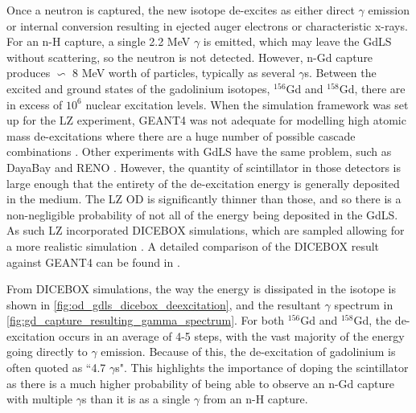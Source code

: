 

\par
Once a neutron is captured, the new isotope de-excites as either direct $\gamma$ emission or internal conversion resulting in ejected auger electrons or characteristic x-rays.
For an n-H capture, a single 2.2 MeV $\gamma$ is emitted, which may leave the GdLS without scattering, so the neutron is not detected.
However, n-Gd capture produces $\backsim$ 8 MeV worth of particles, typically as several $\gamma$s.
Between the excited and ground states of the gadolinium isotopes, ${}^{156}$Gd and ${}^{158}$Gd, there are in excess of $10^{6}$ nuclear excitation levels.
When the simulation framework was set up for the LZ experiment, GEANT4 was not adequate for modelling high atomic mass de-excitations where there are a huge number of possible cascade combinations \cite{ucsb_gdls_dicebox_simulations_ref}.
Other experiments with GdLS have the same problem, such as DayaBay \cite{dayabay_overview_ref} and RENO \cite{reno_overview_ref}.
However, the quantity of scintillator in those detectors is large enough that the entirety of the de-excitation energy is generally deposited in the medium.
The LZ OD is significantly thinner than those, and so there is a non-negligible probability of not all of the energy being deposited in the GdLS.
As such LZ incorporated DICEBOX \cite{dicebox_simulations_ref} simulations, which are sampled allowing for a more realistic simulation \cite{lz_simulations_ref}.
A detailed comparison of the DICEBOX result against GEANT4 can be found in \cite{ucsb_gdls_dicebox_simulations_ref}.
\par
From DICEBOX simulations, the way the energy is dissipated in the isotope is shown in \autoref{fig:od_gdls_dicebox_deexcitation}, and the resultant $\gamma$ spectrum in \autoref{fig:gd_capture_resulting_gamma_spectrum}.
For both ${}^{156}$Gd and ${}^{158}$Gd, the de-excitation occurs in an average of 4-5 steps, with the vast majority of the energy going directly to $\gamma$ emission.
Because of this, the de-excitation of gadolinium is often quoted as ``4.7 $\gamma$s".
This highlights the importance of doping the scintillator as there is a much higher probability of being able to observe an n-Gd capture with multiple $\gamma$s than it is as a single $\gamma$ from an n-H capture.



